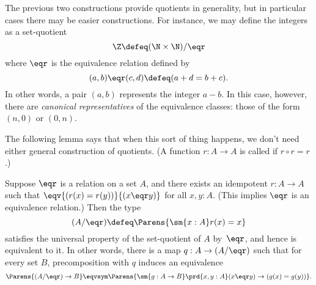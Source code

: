 \begin{rmk}\label{defn-Z}
The previous two constructions provide quotients in generality, but in particular cases there may be easier constructions.
For instance, we may define the integers \Z as a set-quotient
%
%
%
\[ \Z \defeq (\N \times \N)/{\eqr} \]
%
where $\eqr$ is the equivalence relation defined by
%
\[ (a,b) \eqr (c,d) \defeq (a + d = b + c). \]
%
In other words, a pair $(a,b)$ represents the integer $a - b$.
In this case, however, there are \emph{canonical representatives} of the equivalence classes: those of the form $(n,0)$ or $(0,n)$.
\end{rmk}

The following lemma says that when this sort of thing happens, we don't need either general construction of quotients.
(A function $r:A\to A$ is called 
%
%
if $r\circ r = r$.)

\begin{lem}\label{lem:quotient-when-canonical-representatives}
  Suppose $\eqr$ is a relation on a set $A$, and there exists an idempotent $r
  : A \to A$ such that $\eqv{(r(x) = r(y))}{(x \eqr y)}$ for all $x, y: A$.
  (This implies $\eqr$ is an equivalence relation.)
  Then the type
  \begin{equation*}
    (A/{\eqr}) \defeq \Parens{\sm{x : A} r(x) = x}
  \end{equation*}
  satisfies the universal property of the set-quotient of $A$ by~$\eqr$, and hence is equivalent to it.
  In other words, there is a map $q : A \to (A/{\eqr})$ such that for every set $B$, precomposition with $q$ induces an equivalence
  \begin{equation}
    \label{eq:quotient-when-canonical}
    \Parens{(A/{\eqr}) \to B} \eqvsym \Parens{\sm{g : A \to B} \prd{x, y : A} (x \eqr y) \to (g(x) = g(y))}.
  \end{equation}
\end{lem}

